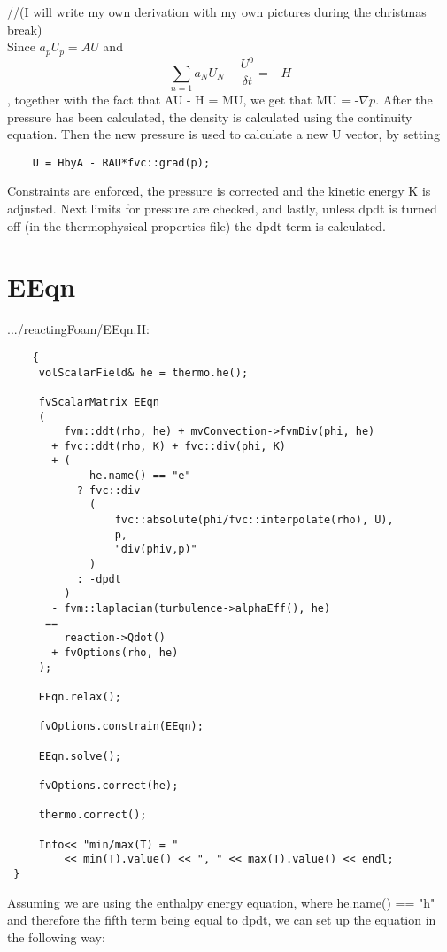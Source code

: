 //(I will write my own derivation with my own pictures during the christmas break) \\
\vspace{\baselineskip}
Since $a_p U_p = AU$ and \[ \sum_{n=1} a_N U_N - \frac{U^0}{\delta t} = -H \], together with the fact that AU - H = MU, we get that MU = -$\nabla p$.
\vspace{\baselineskip}
After the pressure has been calculated, the density is calculated using the continuity equation. Then the new pressure is used to calculate a new U vector, by setting
\begin{verbatim}
    U = HbyA - RAU*fvc::grad(p);
\end{verbatim}
Constraints are enforced, the pressure is corrected and the kinetic energy K is adjusted. Next limits for pressure are checked, and lastly, unless dpdt is turned off (in the thermophysical properties file) the dpdt term is calculated.

\section{EEqn}

.../reactingFoam/EEqn.H:
\begin{verbatim}
    {
     volScalarField& he = thermo.he();
 
     fvScalarMatrix EEqn
     (
         fvm::ddt(rho, he) + mvConvection->fvmDiv(phi, he)
       + fvc::ddt(rho, K) + fvc::div(phi, K)
       + (
             he.name() == "e"
           ? fvc::div
             (
                 fvc::absolute(phi/fvc::interpolate(rho), U),
                 p,
                 "div(phiv,p)"
             )
           : -dpdt
         )
       - fvm::laplacian(turbulence->alphaEff(), he)
      ==
         reaction->Qdot()
       + fvOptions(rho, he)
     );
 
     EEqn.relax();
 
     fvOptions.constrain(EEqn);
 
     EEqn.solve();
 
     fvOptions.correct(he);
 
     thermo.correct();
 
     Info<< "min/max(T) = "
         << min(T).value() << ", " << max(T).value() << endl;
 }
\end{verbatim}

Assuming we are using the enthalpy energy equation, where he.name() == "h" and therefore the fifth term being equal to dpdt, we can set up the equation in the following way:

